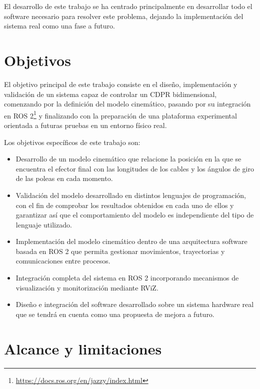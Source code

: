 \vspace{0.25cm}

El desarrollo de este trabajo se ha centrado principalmente en desarrollar todo el software necesario para resolver este problema, dejando la implementación del sistema real como una fase a futuro.

\section{Objetivos}
\label{sec:segundaseccion}

El objetivo principal de este trabajo consiste en el diseño, implementación y validación de un sistema capaz de controlar un CDPR bidimensional, comenzando por la definición del modelo cinemático, pasando por su integración en ROS 2\footnote{\url{https://docs.ros.org/en/jazzy/index.html}} y finalizando con la preparación de una plataforma experimental orientada a futuras pruebas en un entorno físico real.

\newpage

Los objetivos específicos de este trabajo son:

\begin{itemize}
\item Desarrollo de un modelo cinemático que relacione la posición en la que se encuentra el efector final con las longitudes de los cables y los ángulos de giro de las poleas en cada momento.
\item Validación del modelo desarrollado en distintos lenguajes de programación, con el fin de comprobar los resultados obtenidos en cada uno de ellos y garantizar así que el comportamiento del modelo es independiente del tipo de lenguaje utilizado.
\item Implementación del modelo cinemático dentro de una arquitectura software basada en ROS 2 que permita gestionar movimientos, trayectorias y comunicaciones entre procesos.
\item Integración completa del sistema en ROS 2 incorporando mecanismos de visualización y monitorización mediante RViZ.
\item Diseño e integración del software desarrollado sobre un sistema hardware real que se tendrá en cuenta como una propuesta de mejora a futuro.
\end{itemize}

\section{Alcance y limitaciones}
\label{sec:segundaseccion}


